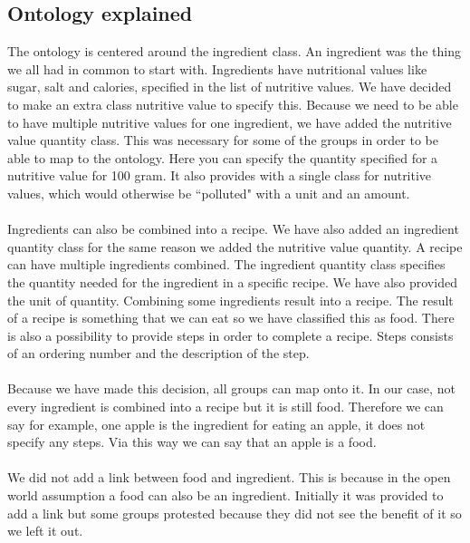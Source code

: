 \subsection{Ontology explained}
The ontology is centered around the ingredient class. An ingredient was the thing we all had in common to start with. Ingredients have nutritional values like sugar, salt and calories, specified in the list of nutritive values. We have decided to make an extra class nutritive value to specify this. Because we need to be able to have multiple nutritive values for one ingredient, we have added the nutritive value quantity class. This was necessary for some of the groups in order to be able to map to the ontology. Here you can specify the quantity specified for a nutritive value for 100 gram. It also provides with a single class for nutritive values, which would otherwise be ``polluted" with a unit and an amount.
\\ \\
Ingredients can also be combined into a recipe. We have also added an ingredient quantity class for the same reason we added the nutritive value quantity. A recipe can have multiple ingredients combined. The ingredient quantity class specifies the quantity needed for the ingredient in a specific recipe. We have also provided the unit of quantity. Combining some ingredients result into a recipe. The result of a recipe is something that we can eat so we have classified this as food. There is also a possibility to provide steps in order to complete a recipe. Steps consists of an ordering number and the description of the step. 
\\ \\
Because we have made this decision, all groups can map onto it. In our case, not every ingredient is combined into a recipe but it is still food. Therefore we can say for example, one apple is the ingredient for eating an apple, it does not specify any steps. Via this way we can say that an apple is a food.
\\ \\
We did not add a link between food and ingredient. This is because in the open world assumption a food can also be an ingredient. Initially it was provided to add a link but some groups protested because they did not see the benefit of it so we left it out. 

